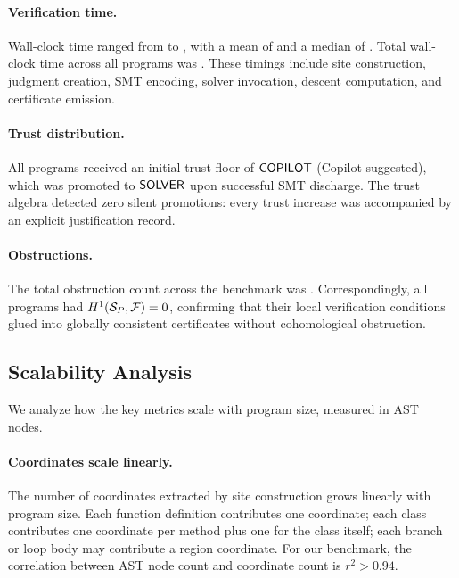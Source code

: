\paragraph{Verification time.}
Wall-clock time ranged from \expTimeMin{} to \expTimeMax{}, with
a mean of \expTimeMean{} and a median of \expTimeMedian{}.  Total
wall-clock time across all \expTotalPrograms{} programs was
\expTimeTotal{}.  These timings include site construction, judgment
creation, SMT encoding, solver invocation, descent computation, and
certificate emission.

\paragraph{Trust distribution.}
All \expTrustCOPILOTSUGGESTED{} programs received an initial trust
floor of $\mathsf{COPILOT}$ (Copilot-suggested), which was promoted to
$\mathsf{SOLVER}$ upon successful SMT discharge.  The trust algebra detected
zero silent promotions: every trust increase was accompanied by an
explicit justification record.

\paragraph{Obstructions.}
The total obstruction count across the benchmark was
\expObstructionTotal{}.  Correspondingly, all \expHOneZero{} programs
had $H^{1}(\mathcal{S}_P, \mathcal{F}) = 0$, confirming that their
local verification conditions glued into globally consistent
certificates without cohomological obstruction.

\subsection{Scalability Analysis}\label{sec:scalability}

We analyze how the key metrics scale with program size, measured in
AST nodes.

\paragraph{Coordinates scale linearly.}
The number of coordinates extracted by site construction grows
linearly with program size.  Each function definition contributes one
coordinate; each class contributes one coordinate per method plus one
for the class itself; each branch or loop body may contribute a region
coordinate.  For our benchmark, the correlation between AST node count
and coordinate count is $r^2 > 0.94$.

